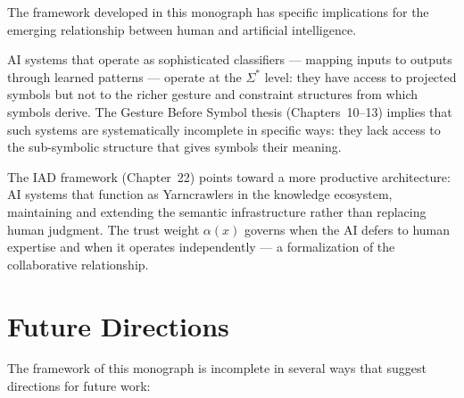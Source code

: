 The framework developed in this monograph has specific implications for
the emerging relationship between human and artificial intelligence.

AI systems that operate as sophisticated classifiers — mapping inputs
to outputs through learned patterns — operate at the $\Sigma^*$ level:
they have access to projected symbols but not to the richer gesture
and constraint structures from which symbols derive. The
Gesture Before Symbol thesis (Chapters~10--13) implies that such systems
are systematically incomplete in specific ways: they lack access to
the sub-symbolic structure that gives symbols their meaning.

The IAD framework (Chapter~22) points toward a more productive
architecture: AI systems that function as Yarncrawlers in the knowledge
ecosystem, maintaining and extending the semantic infrastructure rather
than replacing human judgment. The trust weight $\alpha(x)$ governs
when the AI defers to human expertise and when it operates independently
— a formalization of the collaborative relationship.

\section{Future Directions}

The framework of this monograph is incomplete in several ways that
suggest directions for future work:

